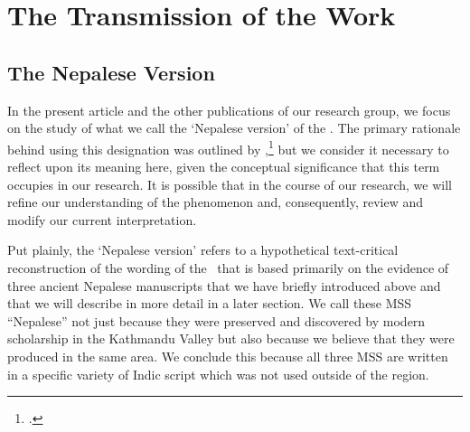 \section{The Transmission of the Work}
\subsection{The Nepalese Version}

In the present article and the other publications of our research group, we focus
on the study of what we call the `Nepalese version' of the \SS. The primary
rationale behind using this designation was outlined by
\citeauthor{kleb-2021b},\footcite[2--3]{kleb-2021b} but we consider it necessary
to reflect upon its meaning here, given the conceptual significance that this term
occupies in our research. %
It is possible that in the course of our research, we will refine our
understanding of the phenomenon and, consequently, review and modify our current
interpretation.%

Put plainly, the `Nepalese version' refers to a hypothetical text-critical
reconstruction of the wording of the \SS\ that is based primarily on the evidence
of three ancient Nepalese manuscripts that we have briefly introduced above and
that we will describe in more detail in a later section.  We call these MSS
“Nepalese” not just because they were preserved and discovered by modern
scholarship in the Kathmandu Valley but also because we believe that they were
produced in the same area. We conclude this because all three MSS are written in a
specific variety of Indic script which was not used outside of the region.

